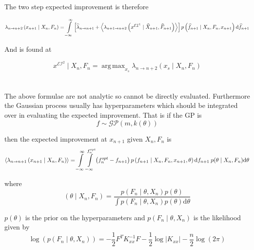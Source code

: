\documentclass[11pt]{article}
\DeclareMathOperator*{\argmax}{arg\,max}
\begin{document}
The two step expected improvement is therefore

\begin{equation}
\lambda_{n\rightarrow n+2}\left(x_{n+1}\mid X_{n},F_{n}\right)=\intop_{-\infty}^{\infty}\left[\widehat{\lambda}_{n\rightarrow n+1}+\left\langle \lambda_{n+1\rightarrow n+2}\left(x^{\mathcal{EI}^{1}}\mid\widehat{X}_{n+1},\widehat{F}_{n+1}\right)\right\rangle \right]p\left(\widehat{f}_{n+1}\mid X_{n},F_{n},x_{n+1}\right)\mathrm{d}\widehat{f}_{n+1}
\end{equation}

And is found at

\begin{equation}
x^{\mathcal{EI}^{2}}\mid X_{n},F_{n}=\argmax_{x_{s}}\lambda_{n\rightarrow n+2}\left(x_{s}\mid X_{n},F_{n}\right)
\end{equation}

\section{}

The above formulae are not analytic so cannot be directly evaluated. Furthermore the Gaussian process usually has hyperparameters which should be integrated over in evaluating the expected improvement. That is if the GP is
\begin{equation}
f\sim\mathcal{GP}\left(m,k\left(\theta\right)\right)
\end{equation}
 

then the expected improvement at $x_{n+1}$  given $X_{n},F_{n}$ is 
  \begin{equation}
  \left\langle \lambda_{n\rightarrow n+1}\left(x_{n+1}\mid X_{n},F_{n}\right)\right\rangle =\intop_{-\infty}^{\infty}\intop_{-\infty}^{f_{n}^{opt}}\left(f_{n}^{opt}-f_{n+1}\right)p\left(f_{n+1}\mid X_{n},F_{n},x_{n+1},\theta\right)\mathrm{d}f_{n+1}\: p(\theta\mid X_{n},F_{n})\mathrm{d}\theta
\end{equation}

where
\begin{equation}
(\theta\mid X_{n},F_{n})=\frac{p(F_{n}\mid\theta,X_{n})p\left(\theta\right)}{\int p(F_{n}\mid\theta,X_{n})p\left(\theta\right)\mathrm{d}\theta}
\end{equation}

$p\left(\theta\right)$ is the prior on the hyperparameters and $p(F_{n}\mid\theta,X_{n})$  is the likelihood given by
\begin{equation}
\log\left(p(F_{n}\mid\theta,X_{n})\right)=-\frac{1}{2}F^{T}K_{xx}^{-1}F-\frac{1}{2}\log\left|K_{xx}\right|-\frac{n}{2}\log\left(2\pi\right)
\end{equation}
 
\end{document}
